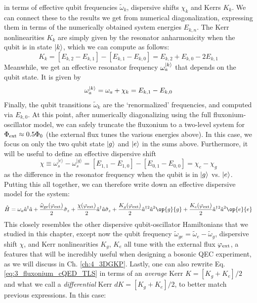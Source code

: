 in terms of effective qubit frequencies $\tilde{\omega}_k$,  dispersive shifts $\chi_k$ and Kerrs $K_k$. We can connect these to the results we get from numerical diagonalization, expressing them in terms of the numerically obtained system energies $E_{k, n}$. The Kerr nonlinearities $K_k$ are simply given by the resonator anharmonicity when the qubit is in state $\lvert k\rangle$, which we can compute as follows:
\begin{equation}
    K_k = [E_{k, 2} - E_{k, 1}] - [E_{k, 1} - E_{k, 0}] = E_{k, 2} + E_{k, 0} - 2E_{k, 1}
\end{equation}
Meanwhile, we get an effective  resonator frequency $\omega_a^{\lvert k\rangle}$ that depends on the qubit state. It is given by
\begin{equation}
    \omega_a^{\lvert k\rangle} = \omega_a + \chi_k = E_{k, 1} - E_{k, 0}
\end{equation}
Finally, the qubit transitions $\tilde{\omega}_k$ are the `renormalized' frequencies, and computed via $E_{k, 0}$. At this point, after numerically diagonalizing using the full fluxonium-oscillator model, we can safely truncate the fluxonium to a two-level system for $\Phi_{\rm ext} \approx 0.5\Phi_0$ (the external flux tunes the various energies above). In this case, we focus on only the two qubit state $\lvert g\rangle$ and $\lvert e\rangle$ in the sums above. Furthermore, it will be useful to define an effective dispersive shift
\begin{equation}
    \chi \equiv \omega_s^{|e\rangle} - \omega_s^{|g\rangle} = [E_{1,1} - E_{1, 0}] - [E_{0, 1} - E_{0, 0}]  = \chi_e - \chi_g
\end{equation}
as the difference in the resonator frequency when the qubit is in $\lvert g\rangle$ vs. $\lvert e\rangle$. Putting this all together, we can therefore write down an effective dispersive model for the system: 
\begin{equation}
    \hat{H} = \omega_a \hat{a}^\dagger\hat{a} + \frac{\tilde{\omega}_{\rm ge}(\varphi_{\rm ext})}{2} \sigmaz + \frac{\chi(\varphi_{\rm ext})}{2}\hat{a}^\dagger\hat{a}\sigmaz  + \frac{K_g(\varphi_{\rm ext})}{2}\hat{a}^\dagger{}^2\hat{a}^2\op{g}{g} + \frac{K_e(\varphi_{\rm ext})}{2}\hat{a}^\dagger{}^2\hat{a}^2\op{e}{e}
\label{eq:3_fluxonium_cQED_TLS}
\end{equation}
This closely resembles the other dispersive qubit-oscillator Hamiltonians that we studied in this chapter, except now the qubit frequency $\tilde{\omega}_{ge} = \tilde{\omega}_{e} - \tilde{\omega}_{g}$, dispersive shift $\chi$, and Kerr nonlinearities $K_g$, $K_e$ all tune with the external flux $\varphi_{\rm ext}$, a features that will be incredibly useful when designing a bosonic QEC experiment, as we will discuss in Ch. \ref{ch:4_3DGKP}. Lastly, one can also rewrite Eq. \eqref{eq:3_fluxonium_cQED_TLS} in terms of an \textit{average} Kerr $K = [K_g + K_e]/2$ and what we call a \textit{differential} Kerr $dK = [K_g + K_e]/2$, to better match previous expressions. In this case:

